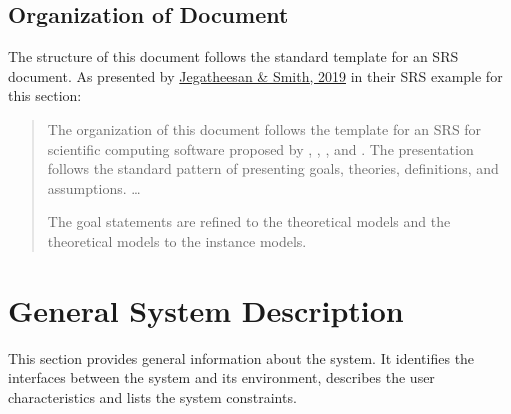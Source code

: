 \documentclass[12pt]{article}
\begin{document}

\subsection{Organization of Document}

The structure of this document follows the standard template for an SRS document.
As presented by \href{https://jacquescarette.github.io/Drasil/examples/swhsnopcm/SRS/HTML/SWHSNoPCM_SRS.html}
{Jegatheesan \& Smith, 2019} in their SRS example for this section:

\begin{quote}
The organization of this document follows the template for an SRS for scientific 
computing software proposed by \cite{koothoor2013}, \cite{smithLai2005}, 
\cite{smithEtAl2007}, and \cite{smithKoothoor2016}. The presentation follows 
the standard pattern of presenting goals, theories, definitions, and assumptions.
\dots


The goal statements are refined to the theoretical models and the theoretical 
models to the instance models.
\end{quote}

\section{General System Description}

This section provides general information about the system.  It identifies the
interfaces between the system and its environment, describes the user
characteristics and lists the system constraints.

\end{document}
